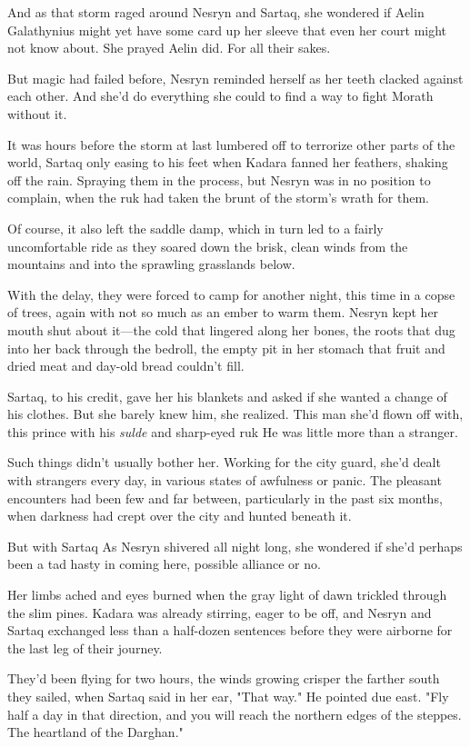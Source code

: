 And as that storm raged around Nesryn and Sartaq, she wondered if Aelin Galathynius might yet have some card up her sleeve that even her court might not know about. She prayed Aelin did. For all their sakes.

But magic had failed before, Nesryn reminded herself as her teeth clacked against each other. And she'd do everything she could to find a way to fight Morath without it.

It was hours before the storm at last lumbered off to terrorize other parts of the world, Sartaq only easing to his feet when Kadara fanned her feathers, shaking off the rain. Spraying them in the process, but Nesryn was in no position to complain, when the ruk had taken the brunt of the storm's wrath for them.

Of course, it also left the saddle damp, which in turn led to a fairly uncomfortable ride as they soared down the brisk, clean winds from the mountains and into the sprawling grasslands below.

With the delay, they were forced to camp for another night, this time in a copse of trees, again with not so much as an ember to warm them. Nesryn kept her mouth shut about it---the cold that lingered along her bones, the roots that dug into her back through the bedroll, the empty pit in her stomach that fruit and dried meat and day-old bread couldn't fill.

Sartaq, to his credit, gave her his blankets and asked if she wanted a change of his clothes. But she barely knew him, she realized. This man she'd flown off with, this prince with his \emph{sulde} and sharp-eyed ruk  He was little more than a stranger.

Such things didn't usually bother her. Working for the city guard, she'd dealt with strangers every day, in various states of awfulness or panic. The pleasant encounters had been few and far between, particularly in the past six months, when darkness had crept over the city and hunted beneath it.

But with Sartaq  As Nesryn shivered all night long, she wondered if she'd perhaps been a tad hasty in coming here, possible alliance or no.

Her limbs ached and eyes burned when the gray light of dawn trickled through the slim pines. Kadara was already stirring, eager to be off, and Nesryn and Sartaq exchanged less than a half-dozen sentences before they were airborne for the last leg of their journey.

They'd been flying for two hours, the winds growing crisper the farther south they sailed, when Sartaq said in her ear, "That way." He pointed due east. "Fly half a day in that direction, and you will reach the northern edges of the steppes. The heartland of the Darghan."

